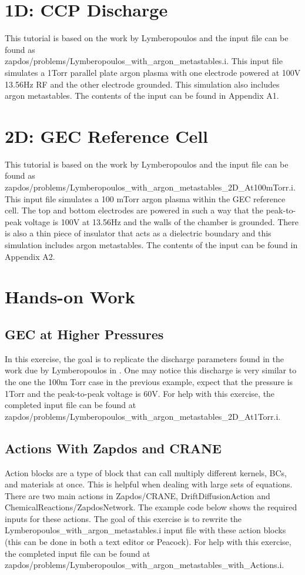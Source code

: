 \documentclass[final]{report}
\begin{document}
  \section{1D: CCP Discharge}
  This tutorial is based on the work by Lymberopoulos \cite{1D_GEC} and the input file can be found as \\
  zapdos/problems/Lymberopoulos\_with\_argon\_metastables.i. This input file simulates a 1Torr parallel plate argon plasma with one electrode powered at 100V 13.56Hz RF and the other electrode grounded. This simulation also includes argon metastables. The contents of the input can be found in Appendix A1.

 \section{2D: GEC Reference Cell}
 This tutorial is based on the work by Lymberopoulos \cite{2D_GEC_100mTorr} and the input file can be found as \\
 zapdos/problems/Lymberopoulos\_with\_argon\_metastables\_2D\_At100mTorr.i.  This input file simulates a 100 mTorr argon plasma within the GEC reference cell. The top and bottom electrodes are powered in such a way that the peak-to-peak voltage is 100V at 13.56Hz and the walls of the chamber is grounded. There is also a thin piece of insulator that acts as a dielectric boundary and this simulation includes argon metastables. The contents of the input can be found in Appendix A2.

 \section{Hands-on Work}
 \subsection{GEC at Higher Pressures}
 In this exercise, the goal is to replicate the discharge parameters found in the work due by Lymberopoulos in \cite{2D_GEC_1Torr}. One may notice this discharge is very similar to the one the 100m Torr case in the previous example, expect that the pressure is 1Torr and the peak-to-peak voltage is 60V. For help with this exercise, the completed input file can be found at zapdos/problems/Lymberopoulos\_with\_argon\_metastables\_2D\_At1Torr.i.

  \subsection{Actions With Zapdos and CRANE}
  Action blocks are a type of block that can call multiply different kernels, BCs, and materials at once. This is helpful when dealing with large sets of equations. There are two main actions in Zapdos/CRANE, DriftDiffusionAction and ChemicalReactions/ZapdosNetwork. The example code below shows the required inputs for these actions. The goal of this exercise is to rewrite the Lymberopoulos\_with\_argon\_metastables.i input file with these action blocks (this can be done in both a text editor or Peacock). For help with this exercise, the completed input file can be found at \\
  zapdos/problems/Lymberopoulos\_with\_argon\_metastables\_with\_Actions.i.
\end{document}
